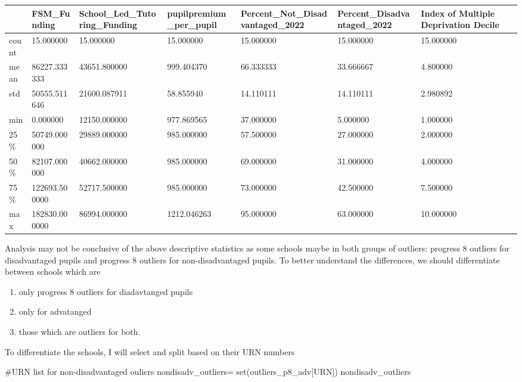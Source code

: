 \documentclass[
  letterpaper,
  DIV=11,
  numbers=noendperiod]{scrartcl}
\newenvironment{Shaded}{\begin{snugshade}}{\end{snugshade}}
\newcommand{\BuiltInTok}[1]{\textcolor[rgb]{0.00,0.23,0.31}{#1}}
\newcommand{\CommentTok}[1]{\textcolor[rgb]{0.37,0.37,0.37}{#1}}
\newcommand{\NormalTok}[1]{\textcolor[rgb]{0.00,0.23,0.31}{#1}}
\newcommand{\OperatorTok}[1]{\textcolor[rgb]{0.37,0.37,0.37}{#1}}
\newcommand{\StringTok}[1]{\textcolor[rgb]{0.13,0.47,0.30}{#1}}
\begin{document}
\begin{longtable}[]{@{}lllllll@{}}
\toprule\noalign{}
& FSM\_Funding & School\_Led\_Tutoring\_Funding &
pupilpremium\_per\_pupil & Percent\_Not\_Disadvantaged\_2022 &
Percent\_Disadvantaged\_2022 & Index of Multiple Deprivation Decile \\
\midrule\noalign{}
\endhead
\bottomrule\noalign{}
\endlastfoot
count & 15.000000 & 15.000000 & 15.000000 & 15.000000 & 15.000000 &
15.000000 \\
mean & 86227.333333 & 43651.800000 & 999.404370 & 66.333333 & 33.666667
& 4.800000 \\
std & 50555.511646 & 21600.087911 & 58.855940 & 14.110111 & 14.110111 &
2.980892 \\
min & 0.000000 & 12150.000000 & 977.869565 & 37.000000 & 5.000000 &
1.000000 \\
25\% & 50749.000000 & 29889.000000 & 985.000000 & 57.500000 & 27.000000
& 2.000000 \\
50\% & 82107.000000 & 40662.000000 & 985.000000 & 69.000000 & 31.000000
& 4.000000 \\
75\% & 122693.500000 & 52717.500000 & 985.000000 & 73.000000 & 42.500000
& 7.500000 \\
max & 182830.000000 & 86994.000000 & 1212.046263 & 95.000000 & 63.000000
& 10.000000 \\
\end{longtable}

Analysis may not be conclusive of the above descriptive statistics as
some schools maybe in both groups of outliers: progress 8 outliers for
disadvantaged pupils and progress 8 outliers for non-disadvantaged
pupils. To better understand the differences, we should differentiate
between schools which are

\begin{enumerate}
\def\labelenumi{\alph{enumi})}
\item
  only progress 8 outliers for diadavtanged pupils
\item
  only for advatanged
\item
  those which are outliers for both.
\end{enumerate}

To differentiate the schools, I will select and split based on their URN
numbers

\begin{Shaded}
\begin{Highlighting}[]
\CommentTok{\#URN list for non{-}disadvantaged ouliers }
\NormalTok{nondisadv\_outliers}\OperatorTok{=} \BuiltInTok{set}\NormalTok{(outliers\_p8\_adv[}\StringTok{\textquotesingle{}URN\textquotesingle{}}\NormalTok{])}
\NormalTok{nondisadv\_outliers }
\end{Highlighting}
\end{Shaded}
\end{document}
